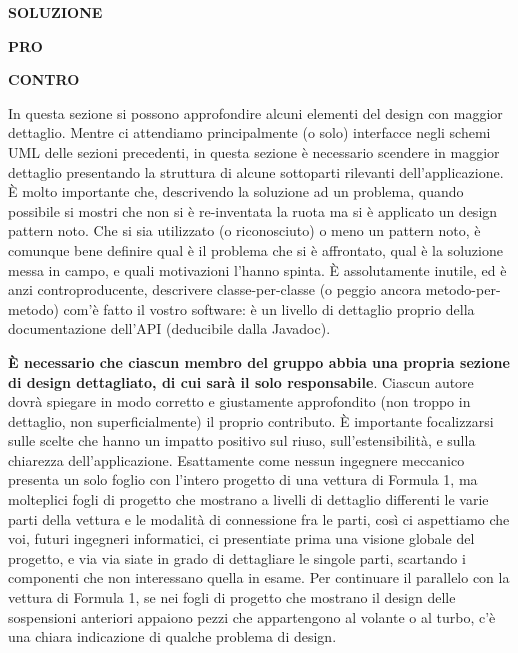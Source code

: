 \documentclass[a4paper,12pt]{report}
\begin{document}
\textbf{SOLUZIONE}

\textbf{PRO}

\textbf{CONTRO}

In questa sezione si possono approfondire alcuni elementi del design con maggior dettaglio.
%
Mentre ci attendiamo principalmente (o solo) interfacce negli schemi UML delle sezioni precedenti,
in questa sezione è necessario scendere in maggior dettaglio presentando la struttura di alcune sottoparti rilevanti dell'applicazione.
%
È molto importante che, descrivendo la soluzione ad un problema, quando possibile si mostri che non si è re-inventata la ruota ma si è applicato un design pattern noto.
%
Che si sia utilizzato (o riconosciuto) o meno un pattern noto, è comunque bene definire qual è il problema che si è affrontato, qual è la soluzione messa in campo, e quali motivazioni l'hanno spinta.
%
È assolutamente inutile, ed è anzi controproducente, descrivere classe-per-classe (o peggio ancora metodo-per-metodo) com'è fatto il vostro software: è un livello di dettaglio proprio della documentazione dell'API (deducibile dalla Javadoc).

\textbf{È necessario che ciascun membro del gruppo abbia una propria sezione di design dettagliato,
di cui sarà il solo responsabile}.
%
Ciascun autore dovrà spiegare in modo corretto e giustamente approfondito (non troppo in dettaglio, non superficialmente) il proprio contributo.
%
È importante focalizzarsi sulle scelte che hanno un impatto positivo sul riuso, sull'estensibilità, e sulla chiarezza dell'applicazione.
%
Esattamente come nessun ingegnere meccanico presenta un solo foglio con l'intero progetto di una vettura di Formula 1, ma molteplici fogli di progetto che mostrano a livelli di dettaglio differenti le varie parti della vettura e le modalità di connessione fra le parti, così ci aspettiamo che voi, futuri ingegneri informatici, ci presentiate prima una visione globale del progetto, e via via siate in grado di dettagliare le singole parti, scartando i componenti che non interessano quella in esame.
%
Per continuare il parallelo con la vettura di Formula 1, se nei fogli di progetto che mostrano il
design delle sospensioni anteriori appaiono pezzi che appartengono al volante o al turbo, c'è una
chiara indicazione di qualche problema di design.
\end{document}
